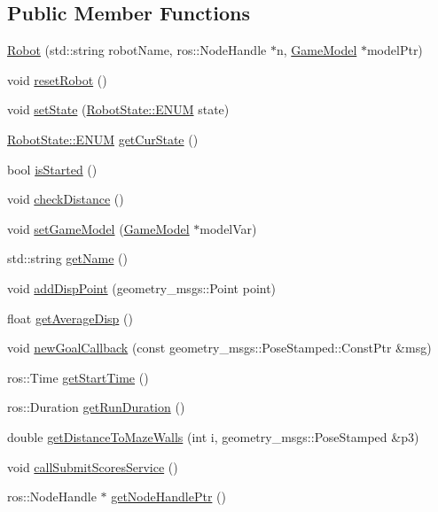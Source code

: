 \subsection*{Public Member Functions}
\begin{DoxyCompactItemize}
\item 
\hyperlink{classRobot_a1250feae21b7afcfa2b5a184dd8aeed7}{Robot} (std\-::string robot\-Name, ros\-::\-Node\-Handle $\ast$n, \hyperlink{classGameModel}{Game\-Model} $\ast$model\-Ptr)
\item 
void \hyperlink{classRobot_a998cd0e4c8b4b1240bb5ffe221bb0d01}{reset\-Robot} ()
\item 
void \hyperlink{classRobot_a83e792105e5240778bb8c6ebe176fc72}{set\-State} (\hyperlink{namespaceRobotState_a35861cd80d5e6a7efe93588700256f40}{Robot\-State\-::\-E\-N\-U\-M} state)
\item 
\hyperlink{namespaceRobotState_a35861cd80d5e6a7efe93588700256f40}{Robot\-State\-::\-E\-N\-U\-M} \hyperlink{classRobot_ace02b610484c2271e5c3b62de23c08a2}{get\-Cur\-State} ()
\item 
bool \hyperlink{classRobot_a97be7246df827ec139a2b2d69d25bad8}{is\-Started} ()
\item 
void \hyperlink{classRobot_a04fd8ba5a0e1968cf127e7061616864e}{check\-Distance} ()
\item 
void \hyperlink{classRobot_a5047939fed73f5d2b5fd8ee830b0ff48}{set\-Game\-Model} (\hyperlink{classGameModel}{Game\-Model} $\ast$model\-Var)
\item 
std\-::string \hyperlink{classRobot_a59e6d6986c1ca9060f92c30800bb6ce8}{get\-Name} ()
\item 
void \hyperlink{classRobot_a12d9c8858090fe98b641f70fd5388776}{add\-Disp\-Point} (geometry\-\_\-msgs\-::\-Point point)
\item 
float \hyperlink{classRobot_abe252f1523d1c1a680b944a6f1d7bc7d}{get\-Average\-Disp} ()
\item 
void \hyperlink{classRobot_a9b62678d0745839be8d4748e39af8764}{new\-Goal\-Callback} (const geometry\-\_\-msgs\-::\-Pose\-Stamped\-::\-Const\-Ptr \&msg)
\item 
ros\-::\-Time \hyperlink{classRobot_a50544dbb3f61929321c232e863871938}{get\-Start\-Time} ()
\item 
ros\-::\-Duration \hyperlink{classRobot_a0eb6c72cf0a8f3ef3f5154f4562d2013}{get\-Run\-Duration} ()
\item 
double \hyperlink{classRobot_a36e8069df6f19bdb75bd60a62baba350}{get\-Distance\-To\-Maze\-Walls} (int i, geometry\-\_\-msgs\-::\-Pose\-Stamped \&p3)
\item 
void \hyperlink{classRobot_a8dd36d19fef73d83868f15f5dc16d5c9}{call\-Submit\-Scores\-Service} ()
\item 
ros\-::\-Node\-Handle $\ast$ \hyperlink{classRobot_a173f6b2c691b073a9a371d6e9fd45939}{get\-Node\-Handle\-Ptr} ()
\end{DoxyCompactItemize}
